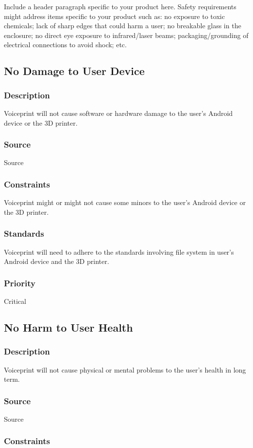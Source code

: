 Include a header paragraph specific to your product here. Safety requirements might address items specific to your product such as: no exposure to toxic chemicals; lack of sharp edges that could harm a user; no breakable glass in the enclosure; no direct eye exposure to infrared/laser beams; packaging/grounding of electrical connections to avoid shock; etc.

\subsection{No Damage to User Device}
\subsubsection{Description}
Voiceprint will not cause software or hardware damage to the user's Android device or the 3D printer.
\subsubsection{Source}
Source
\subsubsection{Constraints}
Voiceprint might or might not cause some minors to the user's Android device or the 3D printer.
\subsubsection{Standards}
Voiceprint will need to adhere to the standards involving file system in user's Android device and the 3D printer.
\subsubsection{Priority}
Critical

\subsection{No Harm to User Health}
\subsubsection{Description}
Voiceprint will not cause physical or mental problems to the user's health in long term.
\subsubsection{Source}
Source
\subsubsection{Constraints}

